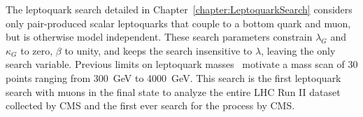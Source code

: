 The leptoquark search detailed in Chapter~\ref{chapter:LeptoquarkSearch} considers only pair-produced scalar leptoquarks that couple to a bottom quark and muon, but is otherwise model independent. These search parameters constrain $\lambda_G$ and $\kappa_G$ to zero, $\beta$ to unity, and keeps the search insensitive to $\lambda$, leaving \MLQ the only search variable. Previous limits on leptoquark masses~\cite{CMSLQ2_2019} motivate a mass scan of 30 points ranging from \SI{300}{\GeV} to \SI{4000}{\GeV}. This search is the first leptoquark search with muons in the final state to analyze the entire LHC Run II dataset collected by CMS and the first ever search for the process \HepProcess{\LQ\LQbar \to \Pmuon\APmuon\bbbar} by CMS.